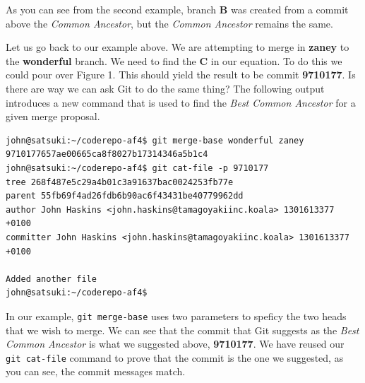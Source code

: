 As you can see from the second example, branch \textbf{B} was created from a commit above the \emph{Common Ancestor}, but the \emph{Common Ancestor} remains the same.  

Let us go back to our example above.  We are attempting to merge in \textbf{zaney} to the \textbf{wonderful} branch.  We need to find the \textbf{C} in our equation.  To do this we could pour over Figure 1.  This should yield the result to be commit \textbf{9710177}.  Is there are way we can ask Git to do the same thing?  The following output introduces a new command that is used to find the \emph{Best Common Ancestor} for a given merge proposal.

\begin{Verbatim}[frame=leftline,framerule=1mm,fontsize=\relsize{-3}] 
john@satsuki:~/coderepo-af4$ git merge-base wonderful zaney
9710177657ae00665ca8f8027b17314346a5b1c4
john@satsuki:~/coderepo-af4$ git cat-file -p 9710177
tree 268f487e5c29a4b01c3a91637bac0024253fb77e
parent 55fb69f4ad26fdb6b90ac6f43431be40779962dd
author John Haskins <john.haskins@tamagoyakiinc.koala> 1301613377 +0100
committer John Haskins <john.haskins@tamagoyakiinc.koala> 1301613377 +0100

Added another file
john@satsuki:~/coderepo-af4$ 
\end{Verbatim}

In our example, \texttt{git merge-base} uses two parameters to speficy the two heads that we wish to merge.  We can see that the commit that Git suggests as the \emph{Best Common Ancestor} is what we suggested above, \textbf{9710177}.  We have reused our \texttt{git cat-file} command to prove that the commit is the one we suggested, as you can see, the commit messages match.




